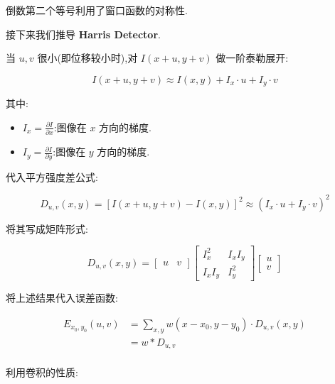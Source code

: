 倒数第二个等号利用了窗口函数的对称性.

\vspace{1em}

接下来我们推导 \textbf{Harris Detector}.

当 $u, v$ 很小(即位移较小时),对 $I(x + u, y + v)$ 做一阶泰勒展开:

\begin{equation}
    I(x + u, y + v) \approx I(x, y) + I_x \cdot u + I_y \cdot v
\end{equation}

其中:
\begin{itemize}
    \item $I_x = \frac{\partial I}{\partial x}$:图像在 $x$ 方向的梯度.
    \item $I_y = \frac{\partial I}{\partial y}$:图像在 $y$ 方向的梯度.
\end{itemize}

代入平方强度差公式:

\begin{equation}
    D_{u,v}(x, y) = \left[I(x + u, y + v) - I(x, y)\right]^2
    \approx \left(I_x \cdot u + I_y \cdot v\right)^2
\end{equation}

将其写成矩阵形式:

\begin{equation}
    D_{u,v}(x, y) =
    \begin{bmatrix}
        u & v
    \end{bmatrix}
    \begin{bmatrix}
        I_x^2 & I_x I_y \\
        I_x I_y & I_y^2
    \end{bmatrix}
    \begin{bmatrix}
        u \\
        v
    \end{bmatrix}
\end{equation}

将上述结果代入误差函数:

\begin{equation}
    \begin{aligned}
    E_{x_0, y_0}(u, v) 
    &= \sum_{x, y} w(x - x_0, y - y_0) \cdot D_{u,v}(x, y) \\
    &= w * D_{u,v}\\
    \end{aligned}
\end{equation}

利用卷积的性质:

